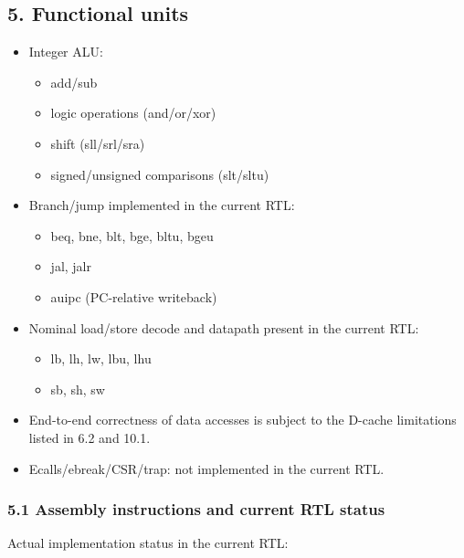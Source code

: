 \documentclass[]{article}
\providecommand{\tightlist}{%
  \setlength{\itemsep}{0pt}\setlength{\parskip}{0pt}}
\begin{document}
\hypertarget{5-functional-units}{%
\subsection{5. Functional units}\label{5-functional-units}}

\begin{itemize}
\tightlist
\item
  Integer ALU:

  \begin{itemize}
  \tightlist
  \item
    add/sub
  \item
    logic operations (and/or/xor)
  \item
    shift (sll/srl/sra)
  \item
    signed/unsigned comparisons (slt/sltu)
  \end{itemize}
\item
  Branch/jump implemented in the current RTL:

  \begin{itemize}
  \tightlist
  \item
    beq, bne, blt, bge, bltu, bgeu
  \item
    jal, jalr
  \item
    auipc (PC-relative writeback)
  \end{itemize}
\item
  Nominal load/store decode and datapath present in the current RTL:

  \begin{itemize}
  \tightlist
  \item
    lb, lh, lw, lbu, lhu
  \item
    sb, sh, sw
  \end{itemize}
\item
  End-to-end correctness of data accesses is subject to the D-cache
  limitations listed in 6.2 and 10.1.
\item
  Ecalls/ebreak/CSR/trap: not implemented in the current RTL.
\end{itemize}

\hypertarget{51-assembly-instructions-and-current-rtl-status}{%
\subsubsection{5.1 Assembly instructions and current RTL
status}\label{51-assembly-instructions-and-current-rtl-status}}

Actual implementation status in the current RTL:
\end{document}
